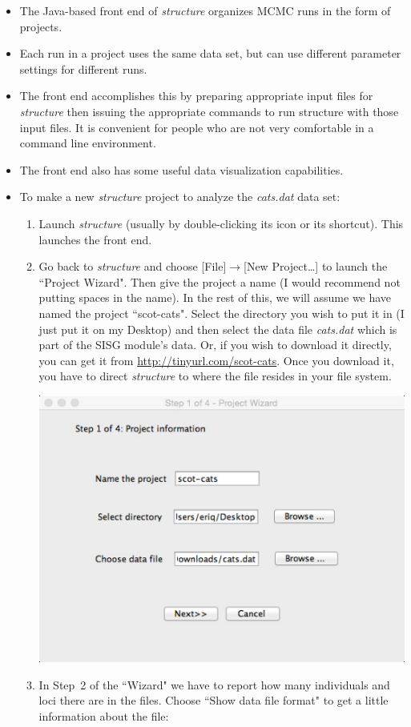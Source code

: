 \begin{itemize}
\item The Java-based front end of {\em structure} organizes MCMC runs in the form of projects.  
\item Each run in a project uses the same data set, but can use different parameter settings for different runs.  
\item The front end accomplishes this by preparing appropriate input files for {\em structure} then issuing the appropriate commands to run structure with those input files. It is convenient for people who are not very comfortable in a command line environment.  
\item The front end also has some useful data visualization capabilities.  
\item To make a new {\em structure} project to analyze the {\em cats.dat} data set:
\begin{enumerate}
\item Launch {\em structure} (usually by double-clicking its icon or its shortcut).  This launches the front end.
\item Go back to {\em structure} and choose [File]$\rightarrow$[New Project\ldots] to launch the ``Project Wizard".  Then give the project a name (I would recommend not putting spaces in the name).  In the rest of this, we will assume we have named the project ``scot-cats".  Select the directory you wish to put it in (I just put it on my Desktop) and then select the data file {\sl cats.dat} which is part of the SISG module's data.  Or, if you wish to download it directly, you can get it from \url{http://tinyurl.com/scot-cats}.  Once you download it, you have to direct {\em structure} to where the file resides in your file system.
\begin{center}
\includegraphics[width=.56\textwidth]{illus/projsetup.jpg}
\end{center}
\item In Step~2 of the ``Wizard" we have to report how many individuals and loci there are in the files.  Choose ``Show data file format" to get a little information about the file:

\end{enumerate}
\end{itemize}

